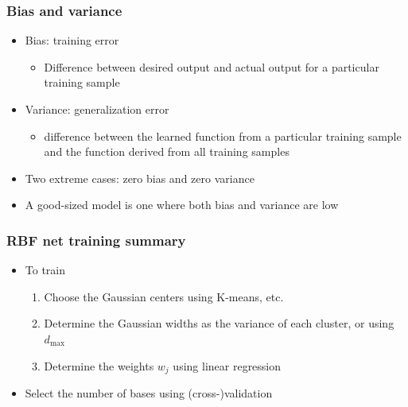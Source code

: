 \documentclass[12pt,notes,mathserif]{beamer}
\begin{document}
\begin{frame}[c]
	\frametitle{Bias and variance}
	\begin{itemize}
		\item Bias: training error
		      \begin{itemize}
			      \item Difference between desired output and actual output for a particular training sample
		      \end{itemize}
		\item Variance: generalization error
		      \begin{itemize}
			      \item  difference between the learned function from a particular training sample and the function derived from all training samples
		      \end{itemize}
		\item Two extreme cases: zero bias and zero variance
		\item A good-sized model is one where both bias and variance are low
	\end{itemize}
\end{frame}


\begin{frame}[c]
	\frametitle{RBF net training summary}
	\begin{itemize}
		\item To train
		      \begin{enumerate}
			      \item Choose the Gaussian centers using K-means, etc.
			      \item Determine the Gaussian widths as the variance of each cluster, or using $d_{\max}$
			      \item Determine the weights $w_j$ using linear regression
		      \end{enumerate}
		\item Select the number of bases using (cross-)validation
	\end{itemize}
\end{frame}
\end{document}
